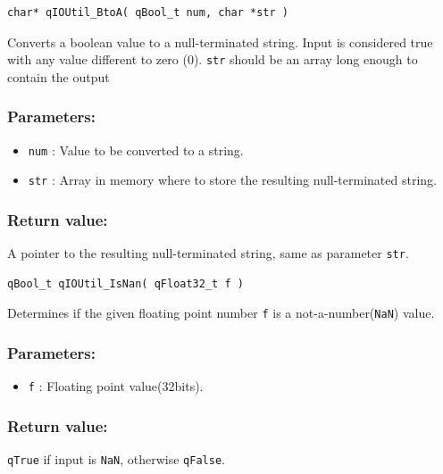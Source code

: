 \documentclass{article}
\begin{document}
\noindent\hrulefill

\begin{lstlisting}[style=CStyle]
char* qIOUtil_BtoA( qBool_t num, char *str )
\end{lstlisting}

Converts a boolean value to a null-terminated string. Input is considered true
with any value different to zero (0). 
\lstinline{str} should be an array long enough to contain the output

\subsubsection*{Parameters:}
\begin{itemize}
    \item \lstinline{num} : Value to be converted to a string.
    \item \lstinline{str} : Array in memory where to store the resulting null-terminated string.
\end{itemize}

\subsubsection*{Return value:}
A pointer to the resulting null-terminated string, same as parameter \lstinline{str}.



\noindent\hrulefill

\begin{lstlisting}[style=CStyle]
qBool_t qIOUtil_IsNan( qFloat32_t f )
\end{lstlisting}

Determines if the given floating point number \lstinline{f} is a not-a-number(\lstinline{NaN}) value. 

\subsubsection*{Parameters:}
\begin{itemize}
    \item \lstinline{f} : Floating point value(32bits).
\end{itemize}

\subsubsection*{Return value:}
\lstinline{qTrue} if input is \lstinline{NaN}, otherwise \lstinline{qFalse}.
\end{document}
